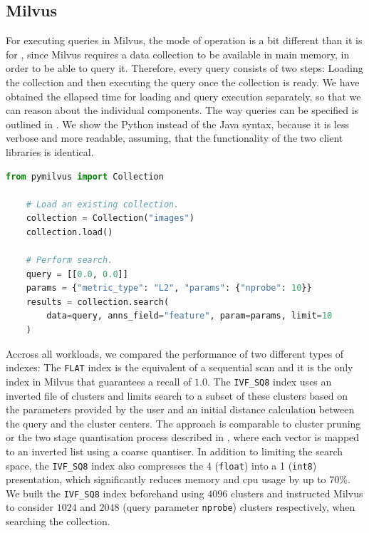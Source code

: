 \subsection{Milvus}
For executing queries in Milvus, the mode of operation is a bit different than it is for \cottontail, since Milvus requires a data collection to be available in main memory, in order to be able to query it. Therefore, every query consists of two steps: Loading the collection and then executing the query once the collection is ready. We have obtained the ellapsed time for loading and query execution separately, so that we can reason about the individual components. The way queries can be specified is outlined in . We show the Python instead of the Java syntax, because it is less verbose and more readable, assuming, that the functionality of the two client libraries is identical.  

\begin{lstlisting}[language=Python, caption={Example of a similarity search query in a collection ``images'' using a 2-dimensional query vector and the Euclidean distance. Before executing the query, the data collection must be loaded.}, label=listing:milvus_query, numbers=none]
    from pymilvus import Collection
    
    # Load an existing collection.
    collection = Collection("images")      
    collection.load()

    # Perform search.
    query = [[0.0, 0.0]]
    params = {"metric_type": "L2", "params": {"nprobe": 10}}
    results = collection.search(
        data=query, anns_field="feature", param=params, limit=10
    )
\end{lstlisting}

Accross all workloads, we compared the performance of two different types of indexes: The \texttt{FLAT} index is the equivalent of a sequential scan and it is the only index in Milvus that guarantees a recall of $1.0$. The \texttt{IVF\_SQ8} index uses an inverted file of clusters and limits search to a subset of these clusters based on the parameters provided by the user and an initial distance calculation between the query and the cluster centers. The approach is comparable to cluster pruning \cite{Chierichetti:2007Finding} or the two stage quantisation process described in \cite{Jegou:2010Product}, where each vector is mapped to an inverted list using a coarse quantiser. In addition to limiting the search space, the \texttt{IVF\_SQ8} index also compresses the \SI{4}{\byte} (\texttt{float}) into a \SI{1}{\byte} (\texttt{int8}) presentation, which significantly reduces memory and \acrshort{cpu} usage by up to 70\%. We built the \texttt{IVF\_SQ8} index beforehand using $4096$ clusters and instructed Milvus to consider $1024$ and $2048$ (query parameter \texttt{nprobe}) clusters respectively, when searching the collection.

